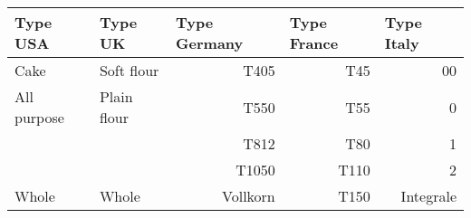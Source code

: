 


\begin{tabular}{|l|l|r|r|r|}
\hline
\textbf{Type USA} & \textbf{Type UK} & \multicolumn{1}{l|}{\textbf{Type Germany}} & \multicolumn{1}{l|}{\textbf{Type France}} & \multicolumn{1}{l|}{\textbf{Type Italy}} \\ \hline
Cake              & Soft flour       & T405                                       & T45                                       & 00                                       \\ \hline
All purpose       & Plain flour      & T550                                       & T55                                       & 0                                        \\ \hline
                  &                  & T812                                       & T80                                       & 1                                        \\ \hline
                  &                  & T1050                                      & T110                                      & 2                                        \\ \hline
Whole             & Whole            & Vollkorn                                   & T150                                      & Integrale                                \\ \hline
\end{tabular}

